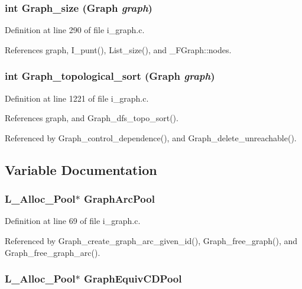 \subsubsection{\setlength{\rightskip}{0pt plus 5cm}int Graph\_\-size (\bf{Graph} {\em graph})}\label{i__graph_8h_a55d48bf0497adaa4d35c6eb40d0f756}




Definition at line 290 of file i\_\-graph.c.

References graph, I\_\-punt(), List\_\-size(), and \_\-FGraph::nodes.
\subsubsection{\setlength{\rightskip}{0pt plus 5cm}int Graph\_\-topological\_\-sort (\bf{Graph} {\em graph})}\label{i__graph_8h_d230ba246ef889997e1199eeb092da21}




Definition at line 1221 of file i\_\-graph.c.

References graph, and Graph\_\-dfs\_\-topo\_\-sort().

Referenced by Graph\_\-control\_\-dependence(), and Graph\_\-delete\_\-unreachable().

\subsection{Variable Documentation}
\subsubsection{\setlength{\rightskip}{0pt plus 5cm}\bf{L\_\-Alloc\_\-Pool}$\ast$ \bf{Graph\-Arc\-Pool}}\label{i__graph_8h_a02c4c93772cf46fa6707a1dca1d7445}




Definition at line 69 of file i\_\-graph.c.

Referenced by Graph\_\-create\_\-graph\_\-arc\_\-given\_\-id(), Graph\_\-free\_\-graph(), and Graph\_\-free\_\-graph\_\-arc().
\subsubsection{\setlength{\rightskip}{0pt plus 5cm}\bf{L\_\-Alloc\_\-Pool}$\ast$ \bf{Graph\-Equiv\-CDPool}}\label{i__graph_8h_d4f2e18fd5ae06bb31f7a0afde51f904}




